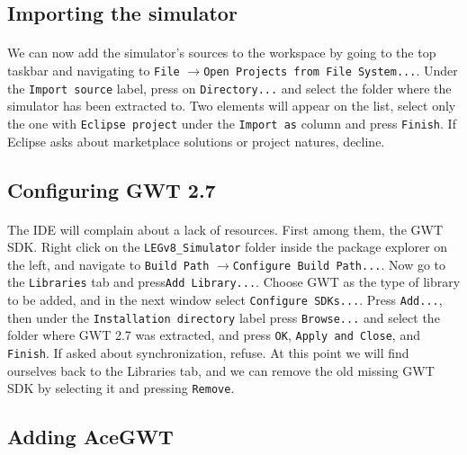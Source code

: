 \subsection{Importing the simulator}
\paragraph{}
We can now add the simulator's sources to the workspace by going to the top taskbar and navigating to \verb|File| $\longrightarrow$\newline \verb|Open Projects from File System...|. Under the \verb|Import source| label, press on \verb|Directory...| and select the folder where the simulator has been extracted to. Two elements will appear on the list, select only the one with \verb|Eclipse project| under the \verb|Import as| column and press \verb|Finish|. If Eclipse asks about marketplace solutions or project natures, decline.
\subsection{Configuring GWT 2.7}
\paragraph{}
The IDE will complain about a lack of resources. First among them, the GWT SDK. Right click on the \verb|LEGv8_Simulator| folder inside the package explorer on the left, and navigate to \verb|Build Path| $\longrightarrow$\newline \verb|Configure Build Path...|. Now go to the \verb|Libraries| tab and press\newline \verb|Add Library...|. Choose GWT as the type of library to be added, and in the next window select \verb|Configure SDKs...|. Press \verb|Add...|, then under the \verb|Installation directory| label press \verb|Browse...| and select the folder where GWT 2.7 was extracted, and press \verb|OK|, \verb|Apply and Close|, and \verb|Finish|. If asked about synchronization, refuse. At this point we will find ourselves back to the Libraries tab, and we can remove the old missing GWT SDK by selecting it and pressing \verb|Remove|.
\subsection{Adding AceGWT}
